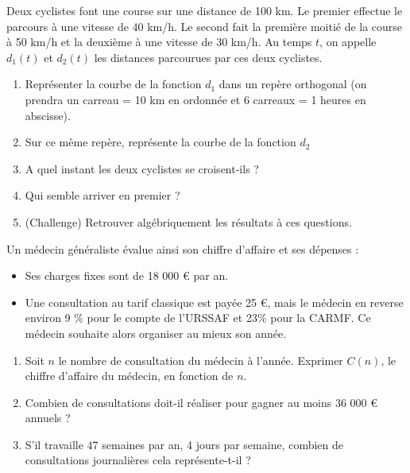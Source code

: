 {\begin{Exercice} %
Deux cyclistes font une course sur une distance de 100 km. Le premier effectue le parcours à une vitesse de 40 km/h. Le second fait la première moitié de la course à 50 km/h et la deuxième à une vitesse de 30 km/h. Au temps $t$, on appelle $d_1(t)$ et $d_2(t)$ les distances parcourues par ces deux cyclistes.
\begin{enumerate}
\item Représenter la courbe de la fonction $d_1$ dans un repère orthogonal (on prendra un carreau = 10 km en ordonnée et 6 carreaux = 1 heures en abscisse).
\item Sur ce même repère, représente la courbe de la fonction $d_2$
\item A quel instant les deux cyclistes se croisent-ils ?
\item Qui semble arriver en premier ?
\item (Challenge) Retrouver algébriquement les résultats à ces questions.
\end{enumerate}
\end{Exercice}


\begin{Exercice} %
Un médecin généraliste évalue ainsi son chiffre d'affaire et ses dépenses :
\begin{itemize}[label=\textcolor{Couleur6}{$\bullet$}]
\item Ses charges fixes sont de 18 000 € par an.
\item Une consultation au tarif classique est payée 25 €, mais le médecin en reverse environ 9 \% pour le compte de l'URSSAF et 23\% pour la CARMF. Ce médecin souhaite alors organiser au mieux son année.
\end{itemize}

\begin{enumerate}
\item Soit $n$ le nombre de consultation du médecin à l'année. Exprimer $C(n)$, le chiffre d'affaire du médecin, en fonction de $n$.
\item Combien de consultations doit-il réaliser pour gagner au moins 36 000 € annuels ?
\item S'il travaille 47 semaines par an, 4 jours par semaine, combien de consultations
journalières cela représente-t-il ?
\end{enumerate}
\end{Exercice}


}
